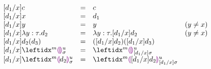\begin{figure}[!ht]
\[
\begin{array}{lcll}
[\dexp_1 / x] c
&=&
c\\
{[\dexp_1 / x] x}
&=&
\dexp_1\\
{[\dexp_1 / x] y}
&=&
y & (y \neq x)\\
{[\dexp_1 / x] \dlam{y}{\htau}{\dexp_2}}
&=&
{\dlam{y}{\htau}{[\dexp_1 / x] \dexp_2}}
& (y \neq x)
\\
{[\dexp_1 / x] \dap{d_2}{d_3}}
&=&
{\dapP{[\dexp_1 / x] d_2}{[\dexp_1 / x] d_3}}
\\
{[\dexp_1 / x]} \dehole{\mvar}{\subst}{m}
&=&
\dehole{\mvar}{[\dexp_1 / x] \subst}{m}
\\
{[\dexp_1 / x] \dhole{\dexp_2}{\mvar}{\subst}{m}}
&=&
\dhole{ [ \dexp_1 / x ] \dexp_2 }{\mvar}{[\dexp_1 / x] \subst}{m}
\end{array}
\]
\end{figure}

